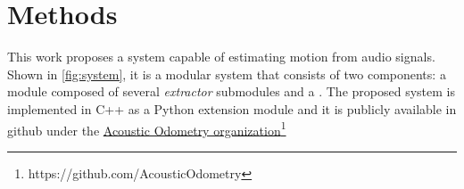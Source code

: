 \section{Methods} \label{sec:methods}


This work proposes a system capable of estimating motion from audio signals.
Shown in \cref{fig:system}, it is a modular system that consists of two
components: a  module composed of several
\emph{extractor} submodules and a . The
proposed system is implemented in C++ as a Python extension module and it is
publicly available in github under the
\href{https://github.com/AcousticOdometry}{Acoustic Odometry
organization}\footnote{https://github.com/AcousticOdometry}





